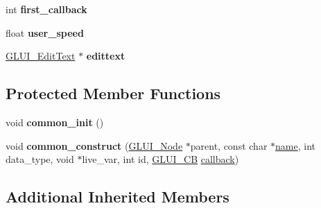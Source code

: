 \begin{DoxyCompactItemize}
\item 
\hypertarget{class_g_l_u_i___spinner_ae16da3f5d44b51089a85ce900b5369c8}{int {\bfseries first\+\_\+callback}}\label{class_g_l_u_i___spinner_ae16da3f5d44b51089a85ce900b5369c8}

\item 
\hypertarget{class_g_l_u_i___spinner_a436397a68c2a7a5a891e6476a70d2807}{float {\bfseries user\+\_\+speed}}\label{class_g_l_u_i___spinner_a436397a68c2a7a5a891e6476a70d2807}

\item 
\hypertarget{class_g_l_u_i___spinner_a708461cddff3603041cf95a1935a64d0}{\hyperlink{class_g_l_u_i___edit_text}{G\+L\+U\+I\+\_\+\+Edit\+Text} $\ast$ {\bfseries edittext}}\label{class_g_l_u_i___spinner_a708461cddff3603041cf95a1935a64d0}

\end{DoxyCompactItemize}
\subsection*{Protected Member Functions}
\begin{DoxyCompactItemize}
\item 
\hypertarget{class_g_l_u_i___spinner_a796a4c94a59a4b5db0672cc3bbf2562e}{void {\bfseries common\+\_\+init} ()}\label{class_g_l_u_i___spinner_a796a4c94a59a4b5db0672cc3bbf2562e}

\item 
\hypertarget{class_g_l_u_i___spinner_af99b5ae2b431195f494d8bdb45f3a79e}{void {\bfseries common\+\_\+construct} (\hyperlink{class_g_l_u_i___node}{G\+L\+U\+I\+\_\+\+Node} $\ast$parent, const char $\ast$\hyperlink{class_g_l_u_i___control_aa95b97d50df45335fc33f0af03958eb3}{name}, int data\+\_\+type, void $\ast$live\+\_\+var, int id, \hyperlink{class_g_l_u_i___c_b}{G\+L\+U\+I\+\_\+\+C\+B} \hyperlink{class_g_l_u_i___control_a96060fe0cc6d537e736dd6eef78e24ab}{callback})}\label{class_g_l_u_i___spinner_af99b5ae2b431195f494d8bdb45f3a79e}

\end{DoxyCompactItemize}
\subsection*{Additional Inherited Members}


